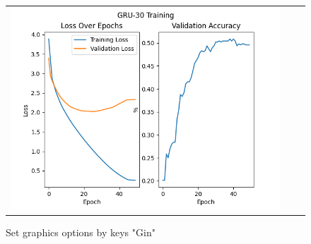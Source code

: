 \documentclass{article}
\begin{document}
\begin{enumerate}[label=1\alph*. ]
\begin{figure}[htb]
\begin{tabularx}{\textwidth}{XXX}
          \includegraphics{images_p1/GRU_30_training_new.png}
        \end{tabularx}
      \caption{Set graphics options by keys "Gin"}
      \end{figure}
\end{enumerate}
\end{document}
